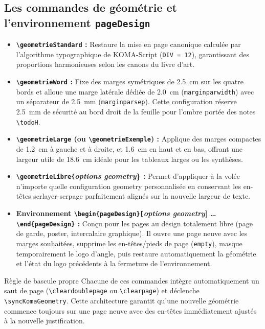 \subsection{Les commandes de géométrie et l'environnement \texttt{pageDesign}}
\label{subsec:trois_commandes_geometrie}

\begin{itemize}
  \item \textbf{\texttt{\textbackslash geometrieStandard} :}
  Restaure la mise en page canonique calculée par l'algorithme typographique de KOMA-Script (\texttt{DIV = 12}), garantissant des proportions harmonieuses selon les canons du livre d'art.

  \item \textbf{\texttt{\textbackslash geometrieWord} :}
  Fixe des marges symétriques de \qty{2.5}{\centi\meter} sur les quatre bords et alloue une marge latérale dédiée de \qty{2.0}{\centi\meter} (\texttt{marginparwidth}) avec un séparateur de \qty{2.5}{\milli\meter} (\texttt{marginparsep}).
  Cette configuration réserve \qty{2.5}{\milli\meter} de sécurité au bord droit de la feuille pour l'ombre portée des notes \texttt{\textbackslash todoH}.

  \item \textbf{\texttt{\textbackslash geometrieLarge} (ou \texttt{\textbackslash geometrieExemple}) :}
  Applique des marges compactes de \qty{1.2}{\centi\meter} à gauche et à droite, et \qty{1.6}{\centi\meter} en haut et en bas, offrant une largeur utile de \qty{18.6}{\centi\meter} idéale pour les tableaux larges ou les synthèses.

  \item \textbf{\texttt{\textbackslash geometrieLibre\{}\emph{options geometry}\textbf{\}} :}
  Permet d'appliquer à la volée n'importe quelle configuration \textsf{geometry} personnalisée en conservant les en-têtes \textsf{scrlayer-scrpage} parfaitement alignés sur la nouvelle largeur de texte.

  \item \textbf{Environnement \texttt{\textbackslash begin\{pageDesign\}[}\emph{options geometry}\textbf{]} \dots{} \texttt{\textbackslash end\{pageDesign\}} :}
  Conçu pour les pages au design totalement libre (page de garde, poster, intercalaire graphique).
  Il ouvre une page neuve avec les marges souhaitées, supprime les en-têtes/pieds de page (\texttt{empty}), masque temporairement le logo d'angle, puis restaure automatiquement la géométrie et l'état du logo précédents à la fermeture de l'environnement.
\end{itemize}

\begin{boiteSynthese}{Règle de bascule propre}
  Chacune de ces commandes intègre automatiquement un saut de page (\texttt{\textbackslash cleardoublepage} ou \texttt{\textbackslash clearpage}) et déclenche \texttt{\textbackslash syncKomaGeometry}.
  Cette architecture garantit qu'une nouvelle géométrie commence toujours sur une page neuve avec des en-têtes immédiatement ajustés à la nouvelle justification.
\end{boiteSynthese}

